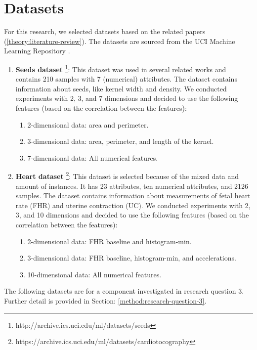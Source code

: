 \section{Datasets} \label{datasets-section}
For this research, we selected datasets based on the related papers (\ref{theory:literature-review}).
The datasets are sourced from the UCI Machine Learning Repository \citep{noauthor_uci_nodate}.
\begin{enumerate}
  \item \textbf{Seeds dataset} \footnote{http://archive.ics.uci.edu/ml/datasets/seeds}: This dataset was used in several related works and contains 210 samples with 7 (numerical) attributes.
        The dataset contains information about seeds, like kernel width and density.
        We conducted experiments with 2, 3, and 7 dimensions and decided to use the following features (based on the correlation between the features):
        \begin{enumerate}
          \item 2-dimensional data: area and perimeter.
          \item 3-dimensional data: area, perimeter, and length of the kernel.
          \item 7-dimensional data: All numerical features.
        \end{enumerate}
  \item \textbf{Heart dataset} \footnote{https://archive.ics.uci.edu/ml/datasets/cardiotocography}: This dataset is selected because of the mixed data and amount of instances.
        It has 23 attributes, ten numerical attributes, and 2126 samples.
        The dataset contains information about measurements of fetal heart rate (FHR) and uterine contraction (UC).
        We conducted experiments with 2, 3, and 10 dimensions and decided to use the following features (based on the correlation between the features):
        \begin{enumerate}
          \item 2-dimensional data: FHR baseline and histogram-min.
          \item 3-dimensional data: FHR baseline, histogram-min, and accelerations.
          \item 10-dimensional data: All numerical features.
        \end{enumerate}
\end{enumerate}
The following datasets are for a component investigated in research question 3.
Further detail is provided in Section: \ref{method:research-question-3}.
